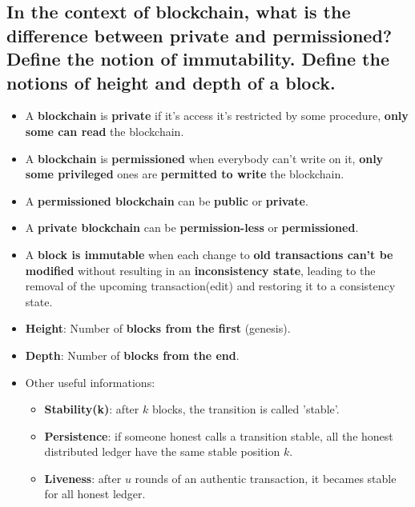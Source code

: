 \documentclass[9pt, letterpaper]{article}
\begin{document}
\subsection{In the context of blockchain, what is the difference between private and permissioned? Define the notion of immutability. Define the notions of height and depth of a block.}
\begin{itemize}
	\item A \textbf{blockchain} is \textbf{private} if it's access it's restricted by some procedure, \textbf{only some can read} the blockchain. 
	\item A \textbf{blockchain} is \textbf{permissioned} when everybody can't write on it, \textbf{only some privileged} ones are \textbf{permitted to write} the blockchain.
	\item A \textbf{permissioned blockchain} can be \textbf{public} or \textbf{private}.
	\item A \textbf{private blockchain} can be \textbf{permission-less} or \textbf{permissioned}.
	\item A \textbf{block is immutable} when each change to \textbf{old transactions can't be modified} without resulting in an \textbf{inconsistency state}, leading to the removal of the upcoming transaction(edit) and restoring it to a consistency state.
	\item \textbf{Height}: Number of \textbf{blocks from the first} (genesis).
	\item \textbf{Depth}: Number of \textbf{blocks from the end}.
	\item Other useful informations:
	\begin{itemize}
		\item \textbf{Stability(k)}: after $k$ blocks, the transition is called 'stable'.
		\item \textbf{Persistence}: if someone honest calls a transition stable, all the honest distributed ledger have the same stable position $k$.
		\item \textbf{Liveness}: after $u$ rounds of an authentic transaction, it becames stable for all honest ledger.
	\end{itemize}
\end{itemize}
\end{document}
